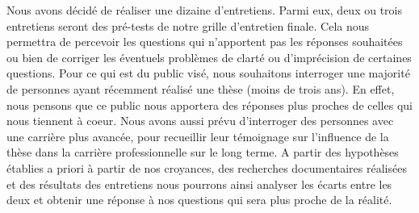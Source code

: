 \documentclass[12pt]{article}
\begin{document}
Nous avons décidé de réaliser une dizaine d'entretiens. Parmi eux, deux ou trois entretiens seront des pré-tests de notre grille d'entretien finale. Cela nous permettra de percevoir les questions qui n'apportent pas les réponses souhaitées ou bien de corriger les éventuels problèmes de clarté ou d'imprécision de certaines questions. Pour ce qui est du public visé, nous souhaitons interroger une majorité de personnes ayant récemment réalisé une thèse (moins de trois ans). En effet, nous pensons que ce public nous apportera des réponses plus proches de celles qui nous tiennent à coeur. Nous avons aussi prévu d'interroger des personnes avec une carrière plus avancée, pour recueillir leur témoignage sur l'influence de la thèse dans la carrière professionnelle sur le long terme. A partir des hypothèses établies a priori à partir de nos croyances, des recherches documentaires réalisées et des résultats des entretiens nous pourrons ainsi analyser les écarts entre les deux et obtenir une réponse à nos questions qui sera plus proche de la réalité.
\end{document}
